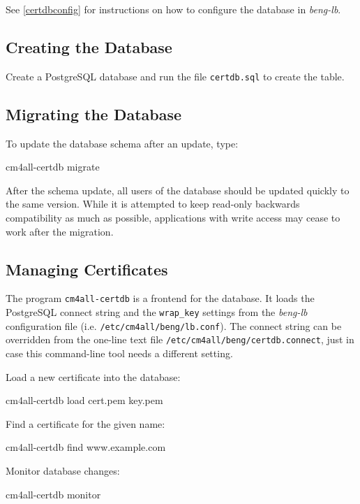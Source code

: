 \documentclass[a4paper,12pt]{article}
\begin{document}
See \ref{certdbconfig} for instructions on how to configure the
database in \emph{beng-lb}.

\subsection{Creating the Database}

Create a PostgreSQL database and run the file \texttt{certdb.sql} to
create the table.

\subsection{Migrating the Database}

To update the database schema after an update, type:

\begin{verbatim*}
cm4all-certdb migrate
\end{verbatim*}

After the schema update, all users of the database should be updated
quickly to the same version.  While it is attempted to keep read-only
backwards compatibility as much as possible, applications with write
access may cease to work after the migration.

\subsection{Managing Certificates}

The program \texttt{cm4all-certdb} is a frontend for the database.  It
loads the PostgreSQL connect string and the \verb|wrap_key| settings
from the \emph{beng-lb} configuration file
(i.e. \texttt{/etc/cm4all/beng/lb.conf}).  The connect string can be
overridden from the one-line text file
\texttt{/etc/cm4all/beng/certdb.connect}, just in case this
command-line tool needs a different setting.

Load a new certificate into the database:

\begin{verbatim*}
cm4all-certdb load cert.pem key.pem
\end{verbatim*}

Find a certificate for the given name:

\begin{verbatim*}
cm4all-certdb find www.example.com
\end{verbatim*}

Monitor database changes:

\begin{verbatim*}
cm4all-certdb monitor
\end{verbatim*}
\end{document}
